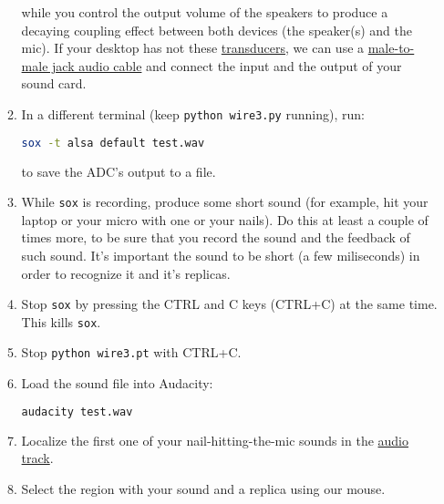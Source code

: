 \begin{enumerate}
\begin{enumerate}
    while you control the output volume of the speakers to produce a
    decaying coupling effect between both devices (the speaker(s) and
    the mic). If your desktop has not
    these \href{https://en.wikipedia.org/wiki/Transducer}{transducers},
    we can use
    a \href{https://www.google.com/search?q=male+to+male+audio+jack+cable&client=firefox-b-d&sxsrf=ALeKk00GZUDGqiOfc0D8xkA_MIYgCuZmSA:1600270049146&source=lnms&tbm=isch&sa=X&ved=2ahUKEwjdvsu-_u3rAhXl0eAKHS90DUoQ_AUoAXoECA0QAw&biw=4288&bih=972}{male-to-male
    jack audio cable} and connect the input and the output of your
    sound card.

  \item In a different terminal (keep \texttt{python wire3.py}
    running), run:

    \begin{lstlisting}[language=Bash]
      sox -t alsa default test.wav
    \end{lstlisting}

    to save the ADC's output to a file.

  \item While \texttt{sox} is recording, produce some short sound (for
    example, hit your laptop or your micro with one or your nails). Do
    this at least a couple of times more, to be sure that you record
    the sound and the feedback of such sound. It's important the sound
    to be short (a few miliseconds) in order to recognize it and it's
    replicas.

  \item Stop \texttt{sox} by pressing the CTRL and C keys (CTRL+C) at
    the same time. This kills \texttt{sox}.

  \item Stop \texttt{python wire3.pt} with CTRL+C.

  \item Load the sound file into Audacity:
    
    \begin{lstlisting}[language=Bash]
      audacity test.wav
    \end{lstlisting}

  \item Localize the first one of your nail-hitting-the-mic sounds in
    the
    \href{https://manual.audacityteam.org/man/audio_tracks.html}{audio
      track}.

  \item Select the region with your sound and a replica using our
    mouse.


\end{enumerate}
\end{enumerate}
